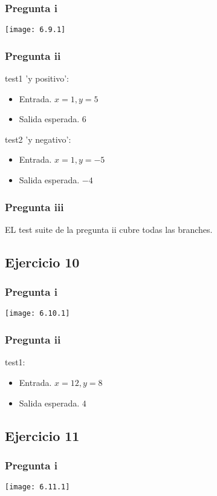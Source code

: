 \subsubsection{Pregunta i}
\texttt{[image: 6.9.1]}

\subsubsection{Pregunta ii}
test1 'y positivo':
\begin{itemize}
    \item Entrada. $ x = 1, y = 5 $
    \item Salida esperada. $ 6 $
\end{itemize}

test2 'y negativo':
\begin{itemize}
    \item Entrada. $ x = 1, y = -5 $
    \item Salida esperada. $ -4 $
\end{itemize}

\subsubsection{Pregunta iii}
EL test suite de la pregunta ii cubre todas las branches.

\subsection{Ejercicio 10}
\subsubsection{Pregunta i}
\texttt{[image: 6.10.1]}

\subsubsection{Pregunta ii}
test1:
\begin{itemize}
    \item Entrada. $ x = 12, y = 8 $
    \item Salida esperada. $ 4 $
\end{itemize}

\subsection{Ejercicio 11}
\subsubsection{Pregunta i}
\texttt{[image: 6.11.1]}

